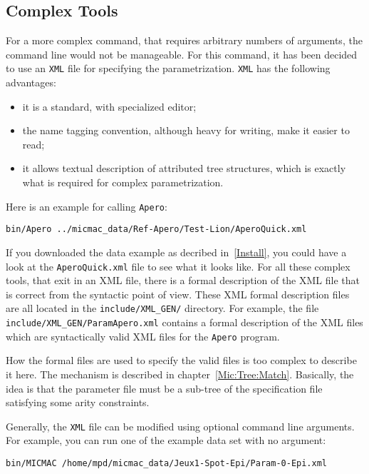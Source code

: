 \subsection{Complex Tools}

For a more complex command, that requires arbitrary numbers of arguments, the command line
would not be manageable. For this command, it has been decided to use an {\tt XML} file
for specifying the parametrization. {\tt XML} has the following advantages:


\begin{itemize}
    \item it is a standard, with  specialized editor;
    \item the name tagging convention, although heavy for writing, make it easier to read;
    \item it allows textual description of attributed tree structures, which is
          exactly what is required for complex parametrization.
\end{itemize}

Here is an example for calling {\tt Apero}:

\begin{verbatim}
bin/Apero ../micmac_data/Ref-Apero/Test-Lion/AperoQuick.xml
\end{verbatim}

If you downloaded the data example as decribed in~\ref{Install}, you could have
a look at the {\tt AperoQuick.xml} file to see what it looks like. For all these
complex tools, that exit in an  XML file, there is a formal description of the
XML file that is correct from the syntactic point of view. These XML formal description
files are all  located in the {\tt include/XML\_GEN/} directory.
For example, the file {\tt include/XML\_GEN/ParamApero.xml} contains a formal
description of the XML files which are syntactically valid XML files for the
{\tt Apero} program.

How the formal files are used to specify the valid files is too complex
to describe it here. The mechanism is described in chapter~\ref{Mic:Tree:Match}.
Basically, the idea is that the parameter file
must be a sub-tree of the specification file satisfying some arity
constraints.


Generally, the {\tt XML} file can be modified using optional command line
arguments. For example, you can run one of the example data set with no
argument:

\begin{verbatim}
bin/MICMAC /home/mpd/micmac_data/Jeux1-Spot-Epi/Param-0-Epi.xml
\end{verbatim}

